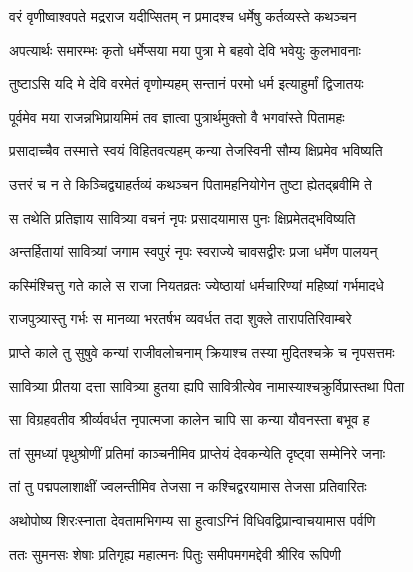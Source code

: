 \begin{center}
\twolineshloka
{वरं वृणीष्वाश्वपते मद्रराज यदीप्सितम्}
{न प्रमादश्च धर्मेषु कर्तव्यस्ते कथञ्चन} %




\twolineshloka
{अपत्यार्थः समारम्भः कृतो धर्मेप्सया मया}
{पुत्रा मे बहवो देवि भवेयुः कुलभावनाः} %


\twolineshloka
{तुष्टाऽसि यदि मे देवि वरमेतं वृणोम्यहम्}
{सन्तानं परमो धर्म इत्याहुर्मां द्विजातयः} %




\twolineshloka
{पूर्वमेव मया राजन्नभिप्रायमिमं तव}
{ज्ञात्वा पुत्रार्थमुक्तो वै भगवांस्ते पितामहः} %


\twolineshloka
{प्रसादाच्चैव तस्मात्ते स्वयं विहितवत्यहम्}
{कन्या तेजस्विनी सौम्य क्षिप्रमेव भविष्यति} %


\twolineshloka
{उत्तरं च न ते किञ्चिद्व्याहर्तव्यं कथञ्चन}
{पितामहनियोगेन तुष्टा ह्येतद्ब्रवीमि ते} %


\twolineshloka
{स तथेति प्रतिज्ञाय सावित्र्या वचनं नृपः}
{प्रसादयामास पुनः क्षिप्रमेतद्भविष्यति} %


\twolineshloka
{अन्तर्हितायां सावित्र्यां जगाम स्वपुरं नृपः}
{स्वराज्ये चावसद्वीरः प्रजा धर्मेण पालयन्} %


\twolineshloka
{कस्मिंश्चित्तु गते काले स राजा नियतव्रतः}
{ज्येष्ठायां धर्मचारिण्यां महिष्यां गर्भमादधे} %


\twolineshloka
{राजपुत्र्यास्तु गर्भः स मानव्या भरतर्षभ}
{व्यवर्धत तदा शुक्ले तारापतिरिवाम्बरे} %


\twolineshloka
{प्राप्ते काले तु सुषुवे कन्यां राजीवलोचनाम्}
{क्रियाश्च तस्या मुदितश्चक्रे च नृपसत्तमः} %

\twolineshloka
{सावित्र्या प्रीतया दत्ता सावित्र्या हुतया ह्यपि}
{सावित्रीत्येव नामास्याश्चक्रुर्विप्रास्तथा पिता} %


\twolineshloka
{सा विग्रहवतीव श्रीर्व्यवर्धत नृपात्मजा}
{कालेन चापि सा कन्या यौवनस्ता बभूव ह} %


\twolineshloka
{तां सुमध्यां पृथुश्रोणीं प्रतिमां काञ्चनीमिव}
{प्राप्तेयं देवकन्येति दृष्ट्वा सम्मेनिरे जनाः} %


\twolineshloka
{तां तु पद्मपलाशाक्षीं ज्वलन्तीमिव तेजसा}
{न कश्चिद्वरयामास तेजसा प्रतिवारितः} %


\twolineshloka
{अथोपोष्य शिरःस्नाता देवतामभिगम्य सा}
{हुत्वाऽग्निं विधिवद्विप्रान्वाचयामास पर्वणि} %


\twolineshloka
{ततः सुमनसः शेषाः प्रतिगृह्य महात्मनः}
{पितुः समीपमगमद्देवी श्रीरिव रूपिणी} %



\end{center}
